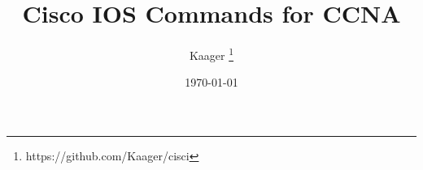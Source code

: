




\title{Cisco IOS Commands for CCNA}
\date{\today}
\author{Kaager \thanks{https://github.com/Kaager/cisci}}

\maketitle

\tableofcontents
\pagebreak


















